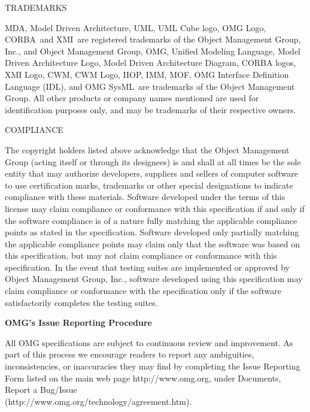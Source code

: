 \documentclass[10pt,fleqn,%
\ifpretendfinal
final%
\else
draft%
\fi,
]{scrreprt}
\newcommand{\rtm}[0]{\small{\textregistered\xspace}}
\newcommand{\OMGparagraph}[1]{
\vspace{3pt}
{\centerline {#1}}
\vspace{3pt}
}
\begin{document}
\OMGparagraph{TRADEMARKS}
MDA\rtm, Model Driven Architecture\rtm, UML\rtm, UML Cube logo\rtm, OMG Logo\rtm, CORBA\rtm\ and XMI\rtm\ are registered trademarks of the Object Management Group, Inc., and Object Management Group\texttrademark\xspace, OMG\texttrademark\xspace , Unified Modeling Language\texttrademark\xspace, Model Driven Architecture Logo\texttrademark\xspace, Model Driven Architecture Diagram\texttrademark\xspace, CORBA logos\texttrademark\xspace, XMI Logo\texttrademark\xspace, CWM\texttrademark\xspace, CWM Logo\texttrademark\xspace, IIOP\texttrademark\xspace , IMM\texttrademark\xspace , MOF\texttrademark\xspace , OMG Interface Definition Language (IDL)\texttrademark\xspace , and OMG  SysML\texttrademark\xspace\   are trademarks of the Object Management Group. All other products or company names mentioned are used for identification purposes only, and may be trademarks of their respective owners.

\OMGparagraph{COMPLIANCE}
The copyright holders listed above acknowledge that the Object Management Group (acting itself or through its designees) is and shall at all times be the sole entity that may authorize developers, suppliers and sellers of computer
 software to use certification marks, trademarks or other special designations to indicate compliance with these materials.
Software developed under the terms of this license may claim compliance or conformance with this specification if and only if the software compliance is of a nature fully matching the applicable compliance points as stated in the
 specification. Software developed only partially matching the applicable compliance points may claim only that the software was based on this specification, but may not claim compliance or conformance with this
  specification. In the event that testing suites are implemented or approved by Object Management Group, Inc., software developed using this specification may claim compliance or conformance with the specification only if the software
   satisfactorily completes the testing suites.

\newpage 
\OMGparagraph{\large{\textbf{OMG's Issue Reporting Procedure}}}
All OMG specifications are subject to continuous review and improvement. As part of this process 
we encourage readers to report any ambiguities, inconsistencies, or inaccuracies
they may find by completing the Issue Reporting Form listed on the main web page
http://www.omg.org, under Documents, Report a Bug/Issue\\ (http://www.omg.org/technology/agreement.htm).
\end{document}
